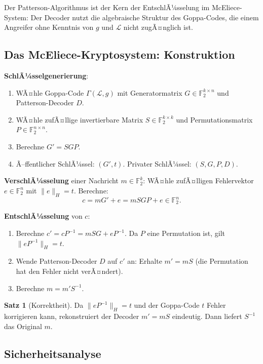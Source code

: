 ﻿\documentclass[a4paper,12pt]{scrreprt}
\theoremstyle{definition}
\newtheorem{satz}{Satz}[section]
\begin{document}
Der Patterson-Algorithmus ist der Kern der EntschlÃ¼sselung im McEliece-System: Der Decoder nutzt die algebraische Struktur des Goppa-Codes, die einem Angreifer ohne Kenntnis von $g$ und $\mathcal{L}$ nicht zugÃ¤nglich ist.

\subsection{Das McEliece-Kryptosystem: Konstruktion}

\textbf{SchlÃ¼sselgenerierung}:
\begin{enumerate}
    \item WÃ¤hle Goppa-Code $\Gamma(\mathcal{L}, g)$ mit Generatormatrix $G \in \mathbb{F}_2^{k \times n}$ und Patterson-Decoder $D$.
    \item WÃ¤hle zufÃ¤llige invertierbare Matrix $S \in \mathbb{F}_2^{k \times k}$ und Permutationsmatrix $P \in \mathbb{F}_2^{n \times n}$.
    \item Berechne $G' = S G P$.
    \item Ã–ffentlicher SchlÃ¼ssel: $(G', t)$. Privater SchlÃ¼ssel: $(S, G, P, D)$.
\end{enumerate}

\textbf{VerschlÃ¼sselung} einer Nachricht $m \in \mathbb{F}_2^k$: WÃ¤hle zufÃ¤lligen Fehlervektor $e \in \mathbb{F}_2^n$ mit $\|e\|_H = t$. Berechne:
\[
c = mG' + e = mSGP + e \in \mathbb{F}_2^n.
\]

\textbf{EntschlÃ¼sselung} von $c$:
\begin{enumerate}
    \item Berechne $c' = cP^{-1} = mSG + eP^{-1}$. Da $P$ eine Permutation ist, gilt $\|eP^{-1}\|_H = t$.
    \item Wende Patterson-Decoder $D$ auf $c'$ an: Erhalte $m' = mS$ (die Permutation hat den Fehler nicht verÃ¤ndert).
    \item Berechne $m = m' S^{-1}$.
\end{enumerate}

\begin{satz}[Korrektheit]
Da $\|eP^{-1}\|_H = t$ und der Goppa-Code $t$ Fehler korrigieren kann, rekonstruiert der Decoder $m' = mS$ eindeutig. Dann liefert $S^{-1}$ das Original $m$.
\end{satz}

\subsection{Sicherheitsanalyse}
\end{document}
